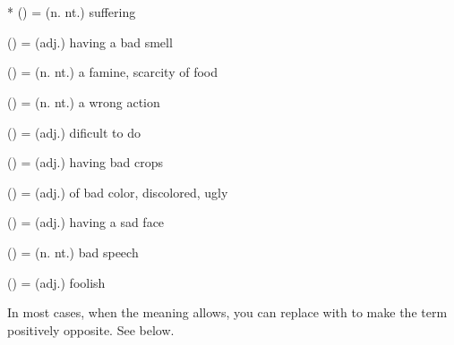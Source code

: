 \section*{}\label{upasagga:du}
\begin{compactitem}
\item {}* () = (n. nt.) suffering
\item {} () = (adj.) having a bad smell 
\item {} () = (n. nt.) a famine, scarcity of food 
\item {} () = (n. nt.) a wrong action
\item {} () = (adj.) dificult to do 
\item {} () = (adj.) having bad crops 
\item {} () = (adj.) of bad color, discolored, ugly
\item {} () = (adj.) having a sad face
\item {} () = (n. nt.) bad speech 
\item {} () = (adj.) foolish
\end{compactitem}
In most cases, when the meaning allows, you can replace  with  to make the term positively opposite. See  below.

